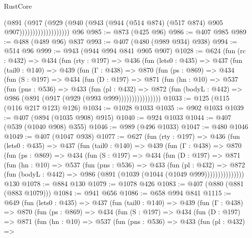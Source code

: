 \begin{lexlean}{RustCore}
\begin{coremodule}
{\begin{coremodule}
{{{{{{                              (@891
                                (@917
                                  (@929
                                    (@940
                                      (@943
                                        (@944 (@514 @874) (@517 @874) @905 @907)))))))))))))))))))
    @96
@985 := @873 (@425 @96)
@986 := @407 @985
@989 := @488 (@489 @96) @837
@993 := @407 (@480 (@989 @934) @938)
@994 := @514 @96
@999 := @943 (@944 @994 @841 @905 @907)
@1028 := @624
    (fun (rc : @432) =>
    @434
      (fun (rty : @197) =>
      @436
        (fun (lets0 : @435) =>
        @437
          (fun (tail0 : @140) =>
          @439
            (fun (Γ : @438) =>
            @870
              (fun (ps : @869) =>
              @434
                (fun (S : @197) =>
                @434
                  (fun (D : @197) =>
                  @871
                    (fun (hn : @10) =>
                    @537
                      (fun (pns : @536) =>
                      @433
                        (fun (pl : @432) =>
                        @872
                          (fun (bodyL : @442) => @986 (@891 (@917 (@929 (@993 @999))))))))))))))))
@1033 := @125 (@115 (@116 @217 @123) @126)
@1034 := @1028 @1033
@1035 := @902 @1033
@1039 := @407 (@894 (@1035 @908) @915)
@1040 := @924 @1033
@1044 := @407 (@539 (@1040 @908) @355)
@1046 := @989 (@496 @1033)
@1047 := @480 @1046
@1049 := @407 (@1047 @938)
@1077 := @627
    (fun (rty : @197) =>
    @436
      (fun (lets0 : @435) =>
      @437
        (fun (tail0 : @140) =>
        @439
          (fun (Γ : @438) =>
          @870
            (fun (ps : @869) =>
            @434
              (fun (S : @197) =>
              @434
                (fun (D : @197) =>
                @871
                  (fun (hn : @10) =>
                  @537
                    (fun (pns : @536) =>
                    @433
                      (fun (pl : @432) =>
                      @872
                        (fun (bodyL : @442) => @986 (@891 (@1039 (@1044 (@1049 @999)))))))))))))))
    @130
@1078 := @884 @130
@1079 := @1078 @426
@1083 := @407 (@880 (@881 (@883 @1079)))
@1084 := @941 @656
@1086 := @658 @994 @841
@1115 := @649
    (fun (lets0 : @435) =>
    @437
      (fun (tail0 : @140) =>
      @439
        (fun (Γ : @438) =>
        @870
          (fun (ps : @869) =>
          @434
            (fun (S : @197) =>
            @434
              (fun (D : @197) =>
              @871
                (fun (hn : @10) =>
                @537
                  (fun (pns : @536) =>
                  @433
                    (fun (pl : @432) =>
}}}}}}
\end{coremodule}}
\end{coremodule}
\end{lexlean}
